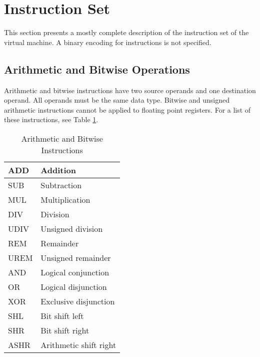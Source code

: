 \section{Instruction Set}

This section presents a mostly complete description
of the instruction set of the virtual machine.
A binary encoding for instructions is not specified.

\subsection{Arithmetic and Bitwise Operations}

Arithmetic and bitwise instructions have two source operands and
one destination operand. All operands must be the same data type.
Bitwise and unsigned arithmetic instructions cannot be applied to
floating point registers. For a list of these instructions,
see Table \ref{ArithmeticAndBitwiseInstructions}.

\begin{table}[h!]
  \begin{center}
    \begin{tabular}{|l|l|}
      \hline
      ADD  & Addition               \\ \hline
      SUB  & Subtraction            \\ \hline
      MUL  & Multiplication         \\ \hline
      DIV  & Division               \\ \hline
      UDIV & Unsigned division      \\ \hline
      REM  & Remainder              \\ \hline
      UREM & Unsigned remainder     \\ \hline
      AND  & Logical conjunction    \\ \hline
      OR   & Logical disjunction    \\ \hline
      XOR  & Exclusive disjunction  \\ \hline
      SHL  & Bit shift left         \\ \hline
      SHR  & Bit shift right        \\ \hline
      ASHR & Arithmetic shift right \\ \hline
    \end{tabular}
  \end{center}
  \caption{Arithmetic and Bitwise Instructions}
  \label{ArithmeticAndBitwiseInstructions}
\end{table}

